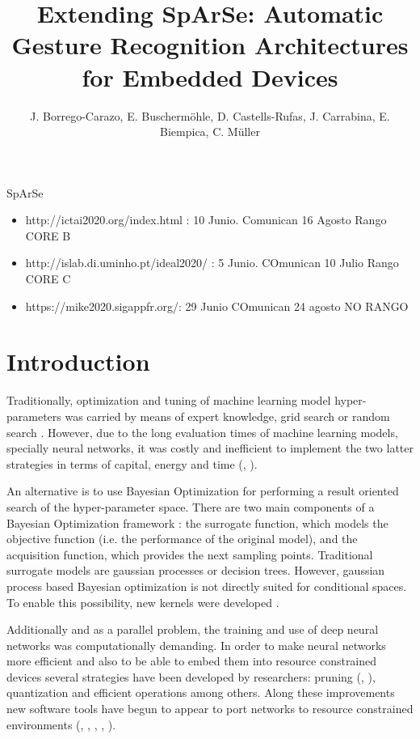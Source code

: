 \documentclass[a4paper, twocolumn]{article}
\title{Extending SpArSe: Automatic Gesture Recognition Architectures for Embedded Devices}
\author{J. Borrego-Carazo, E. Buscherm\"ohle, D. Castells-Rufas, J. Carrabina, E. Biempica, C. M\"uller}
\date{}
\begin{document}
\maketitle
\abstract
SpArSe
\begin{itemize}
	\item http://ictai2020.org/index.html : 10 Junio. Comunican 16 Agosto Rango CORE B
	\item http://islab.di.uminho.pt/ideal2020/ : 5 Junio. COmunican 10 Julio Rango CORE C
	\item https://mike2020.sigappfr.org/: 29 Junio COmunican 24 agosto NO RANGO
\end{itemize}
\section{Introduction}

Traditionally, optimization and tuning of machine learning model hyper-parameters was carried by means of expert knowledge, grid search or random search \cite{Bergstra2012}. However, due to the long evaluation times of machine learning models, specially neural networks, it was costly and inefficient to implement the two latter strategies in terms of capital, energy and time (\cite{Zoph2016}, \cite{Zoph2018}).

An alternative is to use Bayesian Optimization \cite{Mockus1978} for performing a result oriented search of the hyper-parameter space. There are two main components of a Bayesian Optimization framework \cite{Frazier2018}: the surrogate function, which models the objective function (i.e. the performance of the original model), and the acquisition function, which provides the next sampling points. Traditional surrogate models are gaussian processes or decision trees. However, gaussian process based Bayesian optimization is not directly suited for conditional spaces. To enable this possibility, new kernels were developed \cite{Swersky2014}.

Additionally and as a parallel problem, the training and use of deep neural networks was computationally demanding. In order to make neural networks more efficient and also to be able to embed them into resource constrained devices several strategies have been developed by researchers: pruning (\cite{Han2015}, \cite{Cun:1990:OBD:109230.109298}), quantization \cite{Jacob2017} and efficient operations \cite{Howard2017} among others. Along these improvements new software tools have begun to appear to port networks to resource constrained environments (\cite{TFLite}, \cite{Rotem2018}, \cite{ARMNN}, \cite{TensorRT}, \cite{uTensor}).
\end{document}
